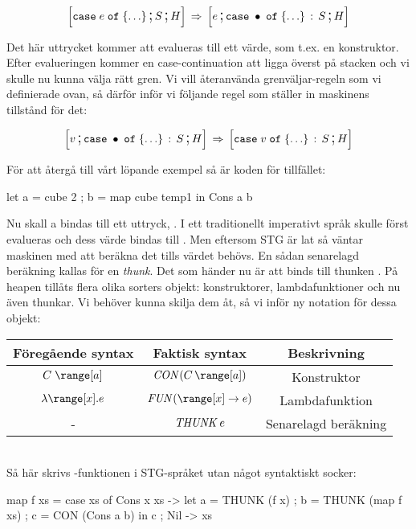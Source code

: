 \documentclass[../Core]{subfiles}
\begin{document}
\[
\text{\large$$}\Big[\mathtt{case}\; e\; \mathtt{of}\;\{\ldots\} \,\text{\Large;}\, S \,\text{\Large;}\, H\Big] \,\Rightarrow\, \text{\large$$}\Big[e \,\text{\Large;}\, \mathtt{case}\;\bullet\; \mathtt{of}\;\{\ldots\} \,:\, S \,\text{\Large;}\,  H\Big]
\]


Det här uttrycket kommer att evalueras till ett värde, som t.ex. en konstruktor.
Efter evalueringen kommer en case-continuation att ligga överst på stacken och vi skulle nu kunna välja
rätt gren. Vi vill återanvända grenväljar-regeln som vi definierade
ovan, så därför inför vi följande regel som ställer in maskinens tillstånd för det:

\[
\text{\large$$}\Big[v \,\text{\Large;}\, \mathtt{case}\;\bullet\; \mathtt{of}\;\{\ldots\} \,:\, S \,\text{\Large;}\, H\Big]\,\Rightarrow\, \text{\large$$}\Big[\mathtt{case}\; v\; \mathtt{of}\;\{\ldots\} \,:\, S \,\text{\Large;}\, H\Big]
\]


För att återgå till vårt löpande exempel så är koden för tillfället:

\begin{codeEx}
let { a = cube 2
    ; b = map cube temp1
    } in Cons a b
\end{codeEx}

Nu skall a bindas till ett uttryck, . I ett traditionellt imperativt språk skulle
 först evalueras och dess värde bindas till . Men eftersom STG
är lat så väntar maskinen med att beräkna det tills värdet behövs.
En sådan senarelagd beräkning kallas för en \emph{thunk}. Det som händer nu är att
 binds till thunken . På heapen tillåts flera olika
sorters objekt: konstruktorer, lambdafunktioner och nu även thunkar.
Vi behöver kunna skilja dem åt, så vi inför ny notation för dessa objekt: \\[0.3cm]
\begin{tabular}{ccc}
Föregående syntax & Faktisk syntax & Beskrivning\tabularnewline
\hline
$C\;\range[a]$ & $\CON C{\range[a]}$ & Konstruktor\tabularnewline
$\lambda\range[x].e$ & $\FUN{\range[x]}e$ & Lambdafunktion\tabularnewline
- & $\text{\emph{THUNK}}\,e$ & Senarelagd beräkning\tabularnewline
\end{tabular} \\[0.3cm]

Så här skrivs -funktionen i STG-språket utan något syntaktiskt socker:

\begin{codeEx}
map f xs = case xs of
    { Cons x xs -> let { a = THUNK (f x)
                       ; b = THUNK (map f xs)
                       ; c = CON (Cons a b)
                       } in c
    ; Nil       -> xs
    }
\end{codeEx}
\end{document}
